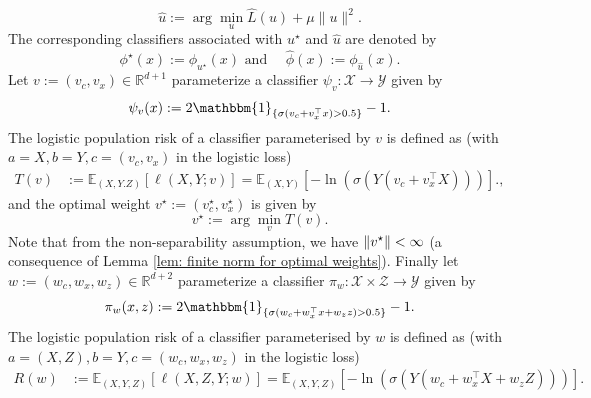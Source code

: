 \begin{equation}\label{eqn: u hat}
    \hat{u} := \arg\min_u \hat{L}(u) + \mu \|u\|^2.
\end{equation}
The corresponding classifiers associated with $u^\star$ and $\hat{u}$ are denoted by
\begin{equation}\label{eqn: phi star and phi hat}
    \phi^\star(x) := \phi_{u^\star}(x) \text{ and } \quad \hat{\phi}(x) := \phi_{\hat{u}}(x).
\end{equation}
Let $ v := (v_c, v_x) \in \mathbb{R}^{d+1} $ parameterize a classifier $ \psi_v: \mathcal{X} \rightarrow \mathcal{Y} $ given by
\begin{equation*}
    \psi_v(x) := 2\mathbbm{1}_{\{\sigma(v_c + v_x^\top x) > 0.5\}} - 1.
\end{equation*}
The logistic population risk of a classifier parameterised by $v$ is defined as (with $a = X, b= Y, c = (v_c, v_x)$ in the logistic loss)
\begin{equation*}
\begin{aligned}
    T(v) &:= \mathbb{E}_{(X, Y. Z)}[\ell(X, Y; v)] = \mathbb{E}_{(X, Y)}[-\ln(\sigma(Y(v_c + v_x^\top X)))].,
\end{aligned}
\end{equation*}
and the optimal weight $ v^\star := (v^\star_c, v^\star_x) $ is given by
\begin{equation}\label{eqn: v star}
    v^\star := \arg\min_v T(v).
\end{equation}
Note that from the non-separability assumption, we have $\|v^\star\| < \infty$ (a consequence of Lemma \ref{lem: finite norm for optimal weights}).
Finally let $ w := (w_c, w_x, w_z) \in \mathbb{R}^{d+2} $ parameterize a classifier $ \pi_w: \mathcal{X} \times \mathcal{Z} \rightarrow \mathcal{Y} $ given by
\begin{equation*}
    \pi_w(x, z) := 2\mathbbm{1}_{\{\sigma(w_c + w_x^\top x + w_z z) > 0.5\}} - 1.
\end{equation*}
The logistic population risk of a classifier parameterised by $w$ is defined as (with $a = (X, Z), b= Y, c = (w_c, w_x, w_z)$ in the logistic loss)
\begin{equation}\label{eqn: Logistic risk}
\begin{aligned}
    R(w) &:= \mathbb{E}_{(X, Y, Z)}[\ell(X, Z, Y; w)] = \mathbb{E}_{(X, Y, Z)}[-\ln(\sigma(Y(w_c + w_x^\top X + w_z Z)))].
\end{aligned}
\end{equation}
